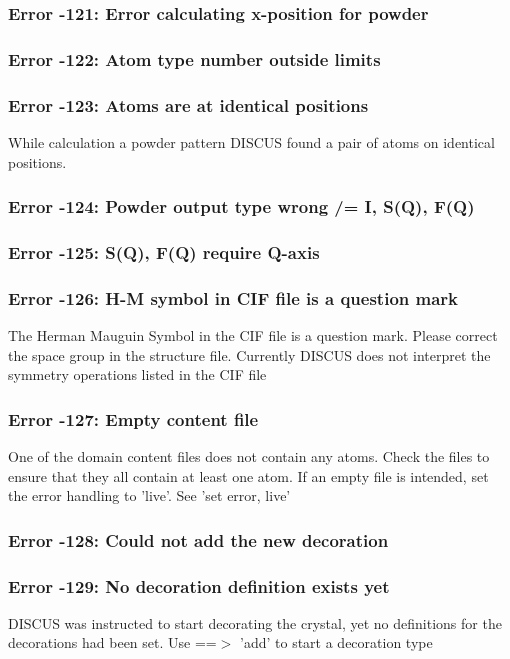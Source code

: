 \subsubsection{Error -121: Error calculating x-position for powder}
\subsubsection{Error -122: Atom type number outside limits}
\subsubsection{Error -123: Atoms are at identical positions}
\par
While calculation a powder pattern DISCUS found a pair of atoms 
on identical positions. 
\subsubsection{Error -124: Powder output type wrong /= I, S(Q), F(Q)}
\subsubsection{Error -125: S(Q), F(Q) require Q-axis}
\subsubsection{Error -126: H-M symbol in CIF file is a question mark}
\par
The Herman Mauguin Symbol in the CIF file is a question mark. 
Please correct the space group in the structure file. 
Currently DISCUS does not interpret the symmetry operations 
listed in the CIF file 
\subsubsection{Error -127: Empty content file}
\par
One of the domain content files does not contain any atoms. 
Check the files to ensure that they all contain at least one 
atom. 
If an empty file is intended, set the error handling to 'live'. 
See 'set error, live' 
\subsubsection{Error -128: Could not add the new decoration}
\subsubsection{Error -129: No decoration definition exists yet}
\par
DISCUS was instructed to start decorating the crystal, yet no 
definitions for the decorations had been set. 
Use ==$> $ 'add' to start a decoration type 
